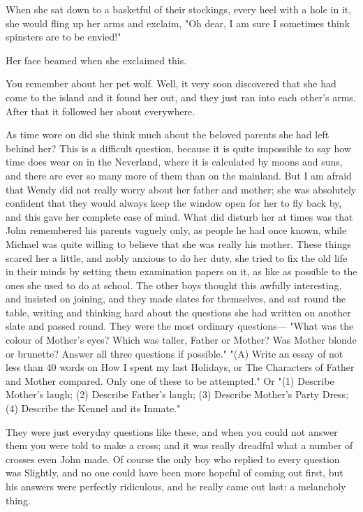 When she sat down to a basketful of their stockings, every heel with a hole in it,
she would fling up her arms and exclaim, "Oh dear, I am sure I sometimes think spinsters are to be envied!"

Her face beamed when she exclaimed this.

You remember about her pet wolf.
Well, it very soon discovered that she had come to the island and it found her out,
and they just ran into each other's arms.
After that it followed her about everywhere.

As time wore on did she think much about the beloved parents she had left behind her?
This is a difficult question,
because it is quite impossible to say how time does wear on in the Neverland,
where it is calculated by moons and suns, and there are ever so many more of them than on the mainland.
But I am afraid that Wendy did not really worry about her father and mother;
she was absolutely confident that they would always keep the window open for her to fly back by,
and this gave her complete ease of mind.
What did disturb her at times was that John remembered his parents vaguely only,
as people he had once known, while Michael was quite willing to believe that she was really his mother.
These things scared her a little,
and nobly anxious to do her duty, she tried to fix the old life in their minds
by setting them examination papers on it, as like as possible to the ones she used to do at school.
The other boys thought this awfully interesting, and insisted on joining,
and they made slates for themselves, and sat round the table,
writing and thinking hard about the questions she had written on another slate and passed round.
They were the most ordinary questions—%
"What was the colour of Mother's eyes?
Which was taller, Father or Mother?
Was Mother blonde or brunette?
Answer all three questions if possible."
"(A) Write an essay of not less than 40 words on How I spent my last Holidays,
or The Characters of Father and Mother compared.
Only one of these to be attempted."
Or "(1) Describe Mother's laugh;
(2) Describe Father's laugh;
(3) Describe Mother's Party Dress;
(4) Describe the Kennel and its Inmate."

They were just everyday questions like these,
and when you could not answer them you were told to make a cross;
and it was really dreadful what a number of crosses even John made.
Of course the only boy who replied to every question was Slightly,
and no one could have been more hopeful of coming out first,
but his answers were perfectly ridiculous, and he really came out last:
a melancholy thing.

